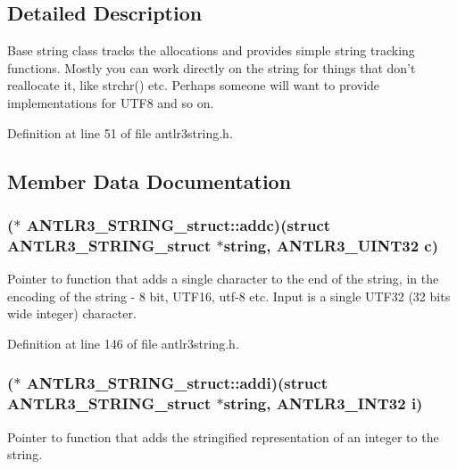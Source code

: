 \subsection{Detailed Description}
Base string class tracks the allocations and provides simple string tracking functions. Mostly you can work directly on the string for things that don't reallocate it, like strchr() etc. Perhaps someone will want to provide implementations for U\-T\-F8 and so on. 

Definition at line 51 of file antlr3string.\-h.



\subsection{Member Data Documentation}
\hypertarget{struct_a_n_t_l_r3___s_t_r_i_n_g__struct_a2ce6c24a62648477f4a89106a0327622}{
\subsubsection[{addc}]{($\ast$ A\-N\-T\-L\-R3\-\_\-\-S\-T\-R\-I\-N\-G\-\_\-struct\-::addc)(struct {\bf A\-N\-T\-L\-R3\-\_\-\-S\-T\-R\-I\-N\-G\-\_\-struct} $\ast$string, {\bf A\-N\-T\-L\-R3\-\_\-\-U\-I\-N\-T32} {\bf c})}}\label{struct_a_n_t_l_r3___s_t_r_i_n_g__struct_a2ce6c24a62648477f4a89106a0327622}
Pointer to function that adds a single character to the end of the string, in the encoding of the string -\/ 8 bit, U\-T\-F16, utf-\/8 etc. Input is a single U\-T\-F32 (32 bits wide integer) character. 

Definition at line 146 of file antlr3string.\-h.

\hypertarget{struct_a_n_t_l_r3___s_t_r_i_n_g__struct_ad2bfbb32818bfce5d267923fab408655}{
\subsubsection[{addi}]{($\ast$ A\-N\-T\-L\-R3\-\_\-\-S\-T\-R\-I\-N\-G\-\_\-struct\-::addi)(struct {\bf A\-N\-T\-L\-R3\-\_\-\-S\-T\-R\-I\-N\-G\-\_\-struct} $\ast$string, {\bf A\-N\-T\-L\-R3\-\_\-\-I\-N\-T32} {\bf i})}}\label{struct_a_n_t_l_r3___s_t_r_i_n_g__struct_ad2bfbb32818bfce5d267923fab408655}
Pointer to function that adds the stringified representation of an integer to the string. 

